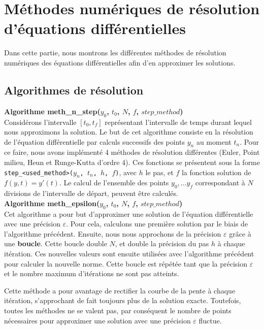 \section{Méthodes numériques de résolution d'équations différentielles}
Dans cette partie, nous montrons les différentes méthodes de résolution numériques des équations différentielles afin d'en approximer les solutions.\\

\subsection{Algorithmes de résolution}

\textbf{Algorithme meth\_n\_step($y_0$, $t_0$, $N$, $f$, $step\_method$)}\\
Considérons l'intervalle $[t_0, t_f]$ représentant l'intervalle de temps durant lequel nous approximons la solution. Le but de cet algorithme consiste en la résolution de l'équation différentielle par calculs successifs des points $y_n$ au moment $t_n$. Pour ce faire, nous avons implémenté 4 méthodes de résolution différentes (Euler, Point milieu, Heun et Runge-Kutta d'ordre 4). Ces fonctions se présentent sous la forme \texttt{step\_<used\_method>($y_n$, $t_n$, $h$, $f$)}, avec $h$ le pas, et $f$ la fonction solution de $f(y,t) = y'(t)$. Le calcul de l'ensemble des points $y_0,...y_f$ correspondant à $N$ divisions de l'intervalle de départ, peuvent être calculés.\\

\textbf{Algorithme meth\_epsilon($y_0$, $t_0$, $N$, $f$, $step\_method$)}\\
Cet algorithme a pour but d'approximer une solution de l'équation différentielle avec une précision $\varepsilon$. Pour cela, calculons une première solution par le biais de l'algorithme précédent. Ensuite, nous nous approchons de la précision $\varepsilon$ grâce à une \textbf{boucle}. Cette boucle double $N$, et double la précision du pas $h$ à chaque itération. Ces nouvelles valeurs sont ensuite utilisées avec l'algorithme précédent pour calculer la nouvelle norme. Cette boucle est répétée tant que la précision $\varepsilon$ et le nombre maximum d'itérations ne sont pas atteints.

Cette méthode a pour avantage de rectifier la courbe de la pente à chaque itération, s'approchant de fait toujours plus de la solution exacte. Toutefois, toutes les méthodes ne se valent pas, par conséquent le nombre de points nécessaires pour approximer une solution avec une précision $\varepsilon$ fluctue.

